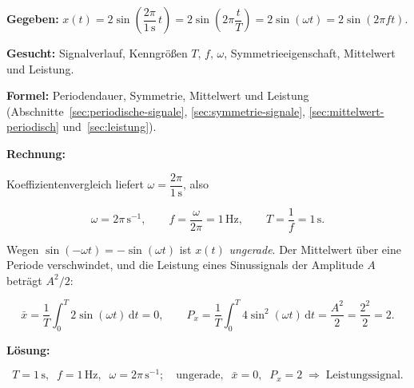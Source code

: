 \begin{beispiel}

\textbf{Gegeben:}
$x(t) = 2\sin\!\left(\dfrac{2\pi}{1\,\mathrm{s}}\,t\right)
= 2\sin\!\left(2\pi\dfrac{t}{T}\right) = 2\sin(\omega t) = 2\sin(2\pi f t)$.

\textbf{Gesucht:} Signalverlauf, Kenngrößen $T,\, f,\, \omega$,
Symmetrieeigenschaft, Mittelwert und Leistung.

\textbf{Formel:} Periodendauer, Symmetrie, Mittelwert und Leistung
(Abschnitte~\ref{sec:periodische-signale}, \ref{sec:symmetrie-signale},
\ref{sec:mittelwert-periodisch} und~\ref{sec:leistung}).

\textbf{Rechnung:}

Koeffizientenvergleich liefert $\omega = \dfrac{2\pi}{1\,\mathrm{s}}$, also

$$
\omega = 2\pi\,\mathrm{s}^{-1}, \qquad
f = \frac{\omega}{2\pi} = 1\,\mathrm{Hz}, \qquad
T = \frac{1}{f} = 1\,\mathrm{s}.
$$

Wegen $\sin(-\omega t) = -\sin(\omega t)$ ist $x(t)$ \emph{ungerade}. Der
Mittelwert über eine Periode verschwindet, und die Leistung eines
Sinussignals der Amplitude $A$ beträgt $A^2/2$:

$$
\bar{x} = \frac{1}{T}\int_0^T 2\sin(\omega t)\,\mathrm{d}t = 0,
\qquad
P_x = \frac{1}{T}\int_0^T 4\sin^2(\omega t)\,\mathrm{d}t
    = \frac{A^2}{2} = \frac{2^2}{2} = 2.
$$

\begin{center}
\end{center}

\textbf{Lösung:}

$$
\boxed{\;T = 1\,\mathrm{s},\;\; f = 1\,\mathrm{Hz},\;\;
\omega = 2\pi\,\mathrm{s}^{-1};\quad
\text{ungerade},\;\; \bar{x} = 0,\;\; P_x = 2 \;\Rightarrow\;
\text{Leistungssignal.}\;}
$$

\end{beispiel}

